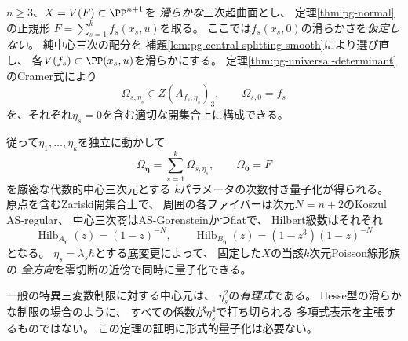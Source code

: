 \begin{theorem}[全てのPoissonブロックの多変数同時量子化]
\label{thm:pg-ad-all-poisson}
$n\ge3$、$X=V(F)\subset\PP^{n+1}$を
\emph{滑らかな}三次超曲面とし、
定理\ref{thm:pg-normal}の正規形
$F=\sum_{s=1}^k f_s(x_s,u)$を取る。
ここでは$f_s(x_s,0)$の滑らかさを\emph{仮定しない}。
純中心三次の配分を
補題\ref{lem:pg-central-splitting-smooth}により選び直し、
各$V(f_s)\subset\PP(x_s,u)$を滑らかにする。
定理\ref{thm:pg-universal-determinant}のCramer式により
\begin{equation}
 \Omega_{s,\eta_s}\in
 Z(A_{f_s,\eta_s})_3,\qquad
 \Omega_{s,0}=f_s
 \label{eq:pg-ad-general-block-center}
\end{equation}
を、それぞれ$\eta_s=0$を含む適切な開集合上に構成できる。

従って$\eta_1,\ldots,\eta_k$を独立に動かして
\begin{equation}
 \boxed{\qquad
 \Omega_{\boldsymbol\eta}=\sum_{s=1}^k\Omega_{s,\eta_s},
 \qquad
 \Omega_{\boldsymbol0}=F
 \qquad}
 \label{eq:pg-ad-general-center}
\end{equation}
を厳密な代数的中心三次元とする
$k$パラメータの次数付き量子化が得られる。
原点を含むZariski開集合上で、
周囲の各ファイバーは次元$N=n+2$のKoszul AS-regular、
中心三次商はAS-Gorensteinかつflatで、
Hilbert級数はそれぞれ
\begin{equation}
 \operatorname{Hilb}_{A_{\boldsymbol\eta}}(z)=(1-z)^{-N},
 \qquad
 \operatorname{Hilb}_{B_{\boldsymbol\eta}}(z)
 =(1-z^3)(1-z)^{-N}
 \label{eq:pg-ad-general-hilbert}
\end{equation}
となる。
$\eta_s=\lambda_s\hbar$とする底変更によって、
固定した$X$の当該$k$次元Poisson線形族の
\emph{全方向}を零切断の近傍で同時に量子化できる。

一般の特異三変数制限に対する中心元は、
$\eta_s^2$の\emph{有理式}である。
Hesse型の滑らかな制限の場合のように、
すべての係数が$\eta_s^4$で打ち切られる
多項式表示を主張するものではない。
この定理の証明に形式的量子化は必要ない。
\end{theorem}
